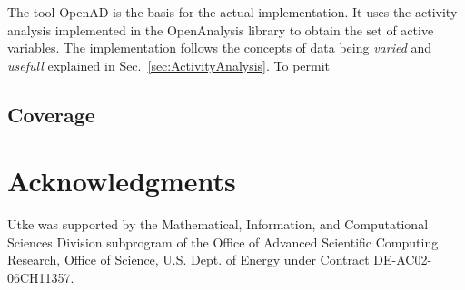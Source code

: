 \documentclass{article}
\newcommand{\refsec}[1]{{Sec.~\ref{#1}}}
\begin{document}
The tool OpenAD \cite{openad} is the basis for the actual implementation. 
It uses the activity analysis implemented in the OpenAnalysis \cite{oaWeb} library 
to obtain the set of active variables. 
The implementation follows the concepts of data being {\em varied} and {\em usefull}
explained in \refsec{sec:ActivityAnalysis}. 
To permit 

 



      
\subsection{Coverage}

\section*{Acknowledgments}
Utke was supported by the Mathematical, Information, and
Computational Sciences Division subprogram of the Office of Advanced
Scientific Computing Research, Office of Science, U.S. Dept. of Energy under
Contract DE-AC02-06CH11357.  




\vfill
\begin{flushright}
\scriptsize
{}
\normalsize
\end{flushright}
\end{document}
